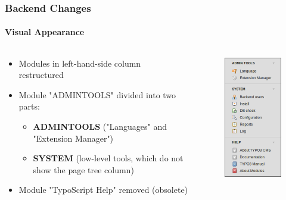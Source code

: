 
\begin{frame}[fragile]
	\frametitle{Backend Changes}
	\framesubtitle{Visual Appearance}

	\begin{columns}[T]

		\begin{column}{.5\textwidth}

			\begin{itemize}
				\item Modules in left-hand-side column restructured
				\item Module "ADMINTOOLS" divided into two parts:

					\begin{itemize}
						\item \textbf{ADMINTOOLS} ("Languages" and "Extension Manager")
						\item \textbf{SYSTEM} (low-level tools, which do not show the page tree column)
					\end{itemize}

				\item Module "TypoScript Help" removed (obsolete)

			\end{itemize}

		\end{column}

		\begin{column}{.5\textwidth}
			\begin{figure}\vspace*{-0.4cm}
				\includegraphics[width=0.35\linewidth]{Images/BackendChanges/AdminTools.png}
			\end{figure}
		\end{column}

	\end{columns}

\end{frame}

